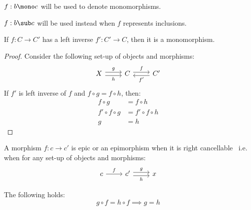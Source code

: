 \begin{remark}
  $f:b\mono c$ will be used to denote monomorphisms.
\end{remark}

\begin{remark}
  $f:b\sub c$ will be used instead when $f$ represents inclusions.
\end{remark}

\begin{theorem}\label{thm:left_inverse_implies_mono}

  If $f:C\to C'$ has a left inverse $f':C'\to C$, then it is a monomorphism.

  \begin{proof}
    Consider the following set-up of objects and morphisms:
    \[
      \begin{tikzcd}[ampersand replacement=\&]
        X \& C \& {C'}
        \arrow["f", shift left=1, from=1-2, to=1-3]
        \arrow["g", shift left=1, from=1-1, to=1-2]
        \arrow["h"', shift right=1, from=1-1, to=1-2]
        \arrow["{f'}", shift left=1, from=1-3, to=1-2]
      \end{tikzcd}
    \]
    If $f'$ is left inverse of $f$ and $f\circ g = f\circ h$, then:
    \[
      \begin{aligned}
        f\circ g &= f\circ h\\
        f'\circ f \circ g &= f'\circ f\circ h\\
        g &= h
      \end{aligned}
    \]
  \end{proof}
  \vspace{-\baselineskip}
\end{theorem}

\begin{definition}[Epimorphism]
  A morphism $f:c\to c'$ is epic or an epimorphism when it is right
  cancellable~\parencite[p.~19]{lane:working_mathematician} i.e. when for any
  set-up of objects and morphisms:
  \[\begin{tikzcd}[ampersand replacement=\&]
    c \& {c'} \& x
    \arrow["h"', shift right=1, from=1-2, to=1-3]
    \arrow["f", from=1-1, to=1-2]
    \arrow["g", shift left=1, from=1-2, to=1-3]
  \end{tikzcd}\]

  The following holds:
  \[g \circ f = h \circ f \implies g = h\]
\end{definition}

